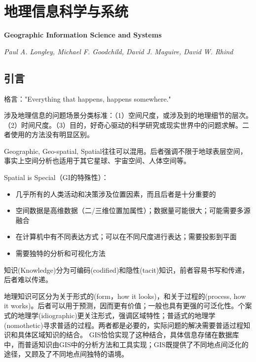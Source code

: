 

\chapter{地理信息科学与系统}
\Large\textbf{Geographic Information Science and Systems}
\par \emph{Paul A. Longley, Michael F. Goodchild, David J. Maguire, David W. Rhind} \normalsize

\section{引言}

\par 格言："Everything that happens, happens somewhere."

\par 涉及地理信息的问题场景分类标准：（1）空间尺度，或涉及到的地理细节的层次。（2）时间尺度。（3）目的，好奇心驱动的科学研究或现实世界中的问题求解。二者使用的方法没有明显区别。

\par Geographic, Geo-spatial, Spatial往往可以混用。后者强调不限于地球表层空间，事实上空间分析也适用于其它星球、宇宙空间、人体空间等。

\par Spatial is Special（GI的特殊性）：
\begin{itemize}
    \item 几乎所有的人类活动和决策涉及位置因素，而且后者是十分重要的
    \item 空间数据是高维数据（二/三维位置加属性）；数据量可能很大；可能需要多源融合
    \item 在计算机中有不同表达方式；可以在不同尺度进行表达；需要投影到平面
    \item 需要独特的分析和可视化方法
\end{itemize}

\par 知识(Knowledge)分为可编码(codified)和隐性(tacit)知识，前者容易书写和传递，后者难以传递。

\par 地理知识可区分为关于形式的(form，how it looks)，和关于过程的(process, how it works)。后者可以用于预测，因而更有价值；一般也具有更强的可泛化性。个案式的地理学(idiographic)更关注形式，强调区域特性；普适式的地理学(nomothetic)寻求普适的过程。两者都是必要的，实际问题的解决需要普适过程知识和具体区域知识的结合。 GIS恰恰实现了这种结合，具体信息存储在数据库中，而普适知识由GIS中的分析方法和工具实现；GIS既提供了不同地点间泛化的途径，又顾及了不同地点间独特的语境。

